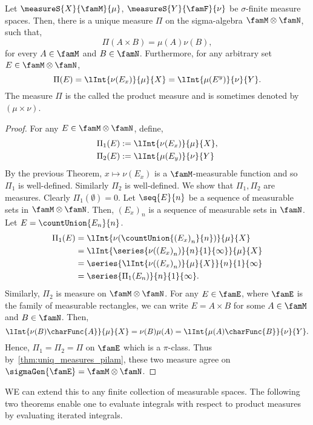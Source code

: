 \begin{Theorem}\label{thm:prod_meas}
    Let $\measureS{X}{\famM}{\mu}$, $\measureS{Y}{\famF}{\nu}$ be $\sigma$-finite measure spaces. Then, there
    is a unique measure $\Pi$ on the sigma-algebra $\famM\otimes\famN$, such that,
    \[\Pi(A\times B) = \mu(A)\nu(B),\]
    for every $A \in \famM$ and $B \in \famN$. Furthermore, for any arbitrary set $E \in \famM\otimes\famN$,
    \[\Pi(E) = \lInt{\nu(E_x)}{\mu}{X} = \lInt{\mu(E^{y})}{\nu}{Y}.\]
    The measure $\Pi$ is the called the product measure and is sometimes denoted by $(\mu\times \nu)$.
\end{Theorem}
\begin{proof}
    For any $E \in \famM\otimes\famN$, define, 
    \begin{align*}
	\Pi_{1}(E) &:= \lInt{\nu(E_x)}{\mu}{X},\\ 
	\Pi_{2}(E) &:= \lInt{\mu(E_y)}{\nu}{Y}
    \end{align*}
    By the previous Theorem, $x\mapsto\nu(E_x)$ is a $\famM$-measurable function and so $\Pi_{1}$ is
    well-defined. Similarly $\Pi_2$ is well-defined.
    We show that $\Pi_{1},\Pi_{2}$ are measures.
    Clearly $\Pi_{1}(\emptyset) = 0$. Let $\seq{E}{n}$ be a sequence of measurable sets in
    $\famM\otimes\famN$. Then, ${(E_x)}_n$ is a sequence of measurable sets in $\famN$. Let $E =
    \countUnion{E_n}{n}$.
    \begin{align*}
	\Pi_{1}(E) &= \lInt{\nu(\countUnion{{(E_x)}_n}{n})}{\mu}{X}\\ 
	&= \lInt{\series{\nu({(E_x)}_n)}{n}{1}{\infty}}{\mu}{X}\\
	&= \series{\lInt{\nu({(E_x)}_n)}{\mu}{X}}{n}{1}{\infty}\\
	&= \series{\Pi_{1}(E_n)}{n}{1}{\infty}.
    \end{align*}
    Similarly, $\Pi_{2}$ is measure on $\famM\otimes\famN$.
    For any $E \in \famE$, where $\famE$ is the family of measurable rectangles, we can write $E = A \times B$
    for some $A \in \famM$ and $B \in \famN$. Then,
    \[\lInt{\nu(B)\charFunc{A}}{\mu}{X} = \nu(B)\mu(A) = \lInt{\mu(A)\charFunc{B}}{\nu}{Y}.\]
    Hence,
    $\Pi_1 = \Pi_2 = \Pi$ on $\famE$ which is a $\pi$-class. Thus by~\ref{thm:uniq_measures_pilam}, these two
    measure agree on $\sigmaGen{\famE} = \famM\otimes\famN$.
\end{proof}
WE can extend this to any finite collection of measurable spaces.
The following two theorems enable one to evaluate integrals with respect to product measures by evaluating
iterated integrals.
